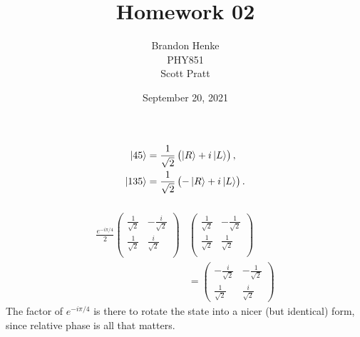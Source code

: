 \documentclass[a4paper,12pt,twoside]{article}
\title{Homework 02}
\author{Brandon Henke\\PHY851\\Scott Pratt}
\date{September 20, 2021}
\begin{document}

\maketitle
\begin{multicols*}{2}

\setcounter{subsection}{9}
\subsection{}%
\subsubsection{}
\begin{align}
	\ket{45} &= \frac{1}{\sqrt{2}} \left( \ket{R} + i\ket{L} \right),\\
	\ket{135} &= \frac{1}{\sqrt{2}} \left( -\ket{R} + i\ket{L} \right).
\end{align}
\subsubsection{}
\begin{align}
	\frac{e^{-i\pi/4}}{2} \begin{pmatrix}
		\frac{1}{\sqrt{2}} & -\frac{i}{\sqrt{2}} \\
		\frac{1}{\sqrt{2}} & \frac{i}{\sqrt{2}} \\
	\end{pmatrix}&
	\begin{pmatrix}
		\frac{1}{\sqrt{2}} & -\frac{1}{\sqrt{2}} \\
		\frac{1}{\sqrt{2}} & \frac{1}{\sqrt{2}} \\
	\end{pmatrix}\nonumber\\
	&=
	\begin{pmatrix}
		-\frac{i}{\sqrt{2}} & -\frac{1}{\sqrt{2}} \\
		\frac{1}{\sqrt{2}} & \frac{i}{\sqrt{2}}
	\end{pmatrix}
\end{align}
The factor of $e^{-i\pi/4}$ is there to rotate the state into a nicer (but identical) form, since relative phase is all that matters.

\end{multicols*}
\end{document}
